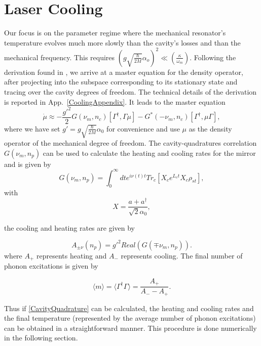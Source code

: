 \documentclass[reprint, amsmath,amssymb, aps,pra]{revtex4-1}
\begin{document}
\section{Laser Cooling}\label{LasCool}

Our focus is on the parameter regime where the mechanical resonator's
temperature evolves much more slowly than the cavity's losses and than
the mechanical frequency. This requires
$(g\sqrt{\frac{\hbar}{2M}}\alpha_o)^2 \ll (\frac{\kappa}{\omega_m})$. Following the
derivation found in \cite{LCNooshi}, we arrive at a master equation
for the density operator, after projecting into the subspace corresponding to
its stationary state and tracing over the cavity degrees of freedom. The technical details of the derivation is reported in App.~\ref{CoolingAppendix}. It leads to the master equation 
\begin{equation}\label{eq:projected_master_equation}
\dot{\mu}\approx -\frac{g'^2}{2}G(\nu_m,n_c)[\Gamma^\dagger,\Gamma\mu]-G^*(-\nu_m,n_c)[\Gamma^\dagger,\mu\Gamma],
\end{equation} where we have set $g'=g\sqrt{\frac{\hbar}{2M}}\alpha_0$  for convenience and use $\mu$ as the density operator of the mechanical degree of freedom. The
cavity-quadratures correlation $G(\nu_m,n_p)$ can be used to calculate the heating and cooling rates
for the mirror and is given by
\begin{equation} \label{CavityQuadrature}
G(\nu_m,n_p) = \int_0^\infty dt e^{i\nu(t) t}Tr_c[X_c e^{L_c t} X_c \rho_{st}],
\end{equation} with 
\begin{equation}
X = \frac{a + a^\dagger}{\sqrt{2}\alpha_0},
\end{equation}

the cooling and heating rates are given by


\begin{equation}
A_{\pm \nu}(n_p) = g'^2Real(G(\mp \nu_m,n_p)).
\end{equation} where $A_+$ represents heating and $A_-$ represents cooling. The final number of phonon excitations is given by

\begin{equation}
\langle m \rangle =\langle \Gamma^\dagger \Gamma \rangle = \frac{A_+}{A_- - A_+}.
\end{equation}

Thus if \eqref{CavityQuadrature} can be calculated, the heating and
cooling rates and the final temperature (represented by the
average number of phonon excitations) can be obtained in a
straightforward manner. This procedure is done numerically in the
following section.
\end{document}
